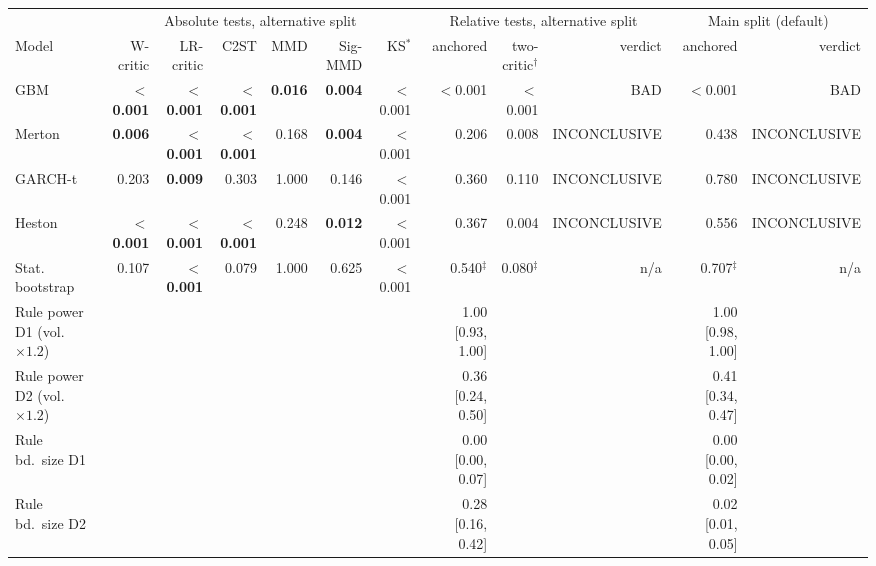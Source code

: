 \begin{tabular}{lrrrrrrrrrrr}
\toprule
 & \multicolumn{6}{c}{Absolute tests, alternative split} & \multicolumn{3}{c}{Relative tests, alternative split} & \multicolumn{2}{c}{Main split (default)} \\
\cmidrule(lr){2-7} \cmidrule(lr){8-10} \cmidrule(lr){11-12}
Model & W-critic & LR-critic & C2ST & MMD & Sig-MMD & KS$^\ast$ & anchored & two-critic$^\dagger$ & verdict & anchored & verdict \\
\midrule
GBM & \textbf{$<$0.001} & \textbf{$<$0.001} & \textbf{$<$0.001} & \textbf{0.016} & \textbf{0.004} & $<$0.001 & $<$0.001 & $<$0.001 & BAD & $<$0.001 & BAD \\
Merton & \textbf{0.006} & \textbf{$<$0.001} & \textbf{$<$0.001} & 0.168 & \textbf{0.004} & $<$0.001 & 0.206 & 0.008 & INCONCLUSIVE & 0.438 & INCONCLUSIVE \\
GARCH-t & 0.203 & \textbf{0.009} & 0.303 & 1.000 & 0.146 & $<$0.001 & 0.360 & 0.110 & INCONCLUSIVE & 0.780 & INCONCLUSIVE \\
Heston & \textbf{$<$0.001} & \textbf{$<$0.001} & \textbf{$<$0.001} & 0.248 & \textbf{0.012} & $<$0.001 & 0.367 & 0.004 & INCONCLUSIVE & 0.556 & INCONCLUSIVE \\
Stat. bootstrap & 0.107 & \textbf{$<$0.001} & 0.079 & 1.000 & 0.625 & $<$0.001 & 0.540$^\ddagger$ & 0.080$^\ddagger$ & n/a & 0.707$^\ddagger$ & n/a \\
Rule power D1 (vol.\ $\times1.2$) &  &  &  &  &  &  & 1.00 [0.93, 1.00] &  &  & 1.00 [0.98, 1.00] &  \\
Rule power D2 (vol.\ $\times1.2$) &  &  &  &  &  &  & 0.36 [0.24, 0.50] &  &  & 0.41 [0.34, 0.47] &  \\
Rule bd.\ size D1 &  &  &  &  &  &  & 0.00 [0.00, 0.07] &  &  & 0.00 [0.00, 0.02] &  \\
Rule bd.\ size D2 &  &  &  &  &  &  & 0.28 [0.16, 0.42] &  &  & 0.02 [0.01, 0.05] &  \\
\bottomrule
\end{tabular}
